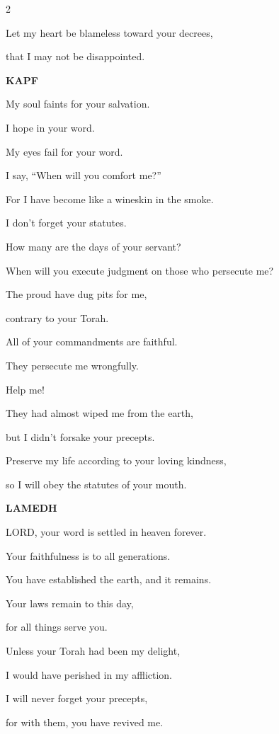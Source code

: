 \begin{multicols}{2}
	
	\myverse{}Let my heart be blameless toward your decrees,
	
	that I may not be disappointed.
	
	\vspace{\baselineskip}
	
	\textbf{KAPF}
	
	
	\myverse{}My soul faints for your salvation.
	
	I hope in your word.
	
	
	\myverse{}My eyes fail for your word.
	
	I say, “When will you comfort me?”
	
	
	\myverse{}For I have become like a wineskin in the smoke.
	
	I don’t forget your statutes.
	
	
	\myverse{}How many are the days of your servant?
	
	When will you execute judgment on those who persecute me?
	
	
	\myverse{}The proud have dug pits for me,
	
	contrary to your Torah.
	
	
	\myverse{}All of your commandments are faithful.
	
	They persecute me wrongfully.
	
	Help me!
	
	
	\myverse{}They had almost wiped me from the earth,
	
	but I didn’t forsake your precepts.
	
	
	\myverse{}Preserve my life according to your loving kindness,
	
	so I will obey the statutes of your mouth.
	
	\vspace{\baselineskip}
	\textbf{LAMEDH}
	
	
	\myverse{}LORD, your word is settled in heaven forever.
	
	
	\myverse{}Your faithfulness is to all generations.
	
	You have established the earth, and it remains.
	
	
	\myverse{}Your laws remain to this day,
	
	for all things serve you.
	
	
	\myverse{}Unless your Torah had been my delight,
	
	I would have perished in my affliction.
	
	
	\myverse{}I will never forget your precepts,
	
	for with them, you have revived me.
	

\end{multicols}
